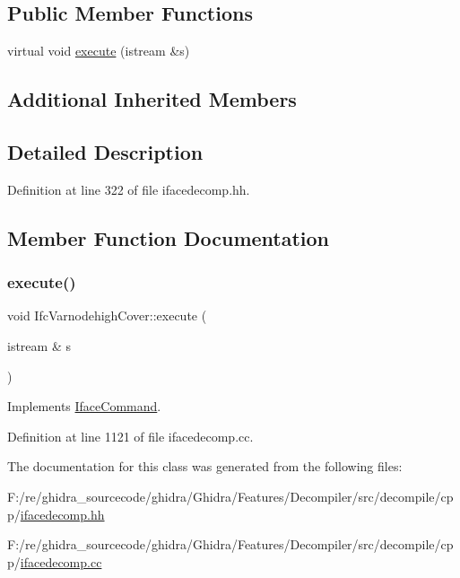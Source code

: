 \subsection*{Public Member Functions}
\begin{DoxyCompactItemize}
\item 
virtual void \mbox{\hyperlink{class_ifc_varnodehigh_cover_af8cd84bbe78884138b139ff231098894}{execute}} (istream \&s)
\end{DoxyCompactItemize}
\subsection*{Additional Inherited Members}


\subsection{Detailed Description}


Definition at line 322 of file ifacedecomp.\+hh.



\subsection{Member Function Documentation}
\mbox{\label{class_ifc_varnodehigh_cover_af8cd84bbe78884138b139ff231098894}} 
\subsubsection{\texorpdfstring{execute()}{execute()}}
{\footnotesize\ttfamily void Ifc\+Varnodehigh\+Cover\+::execute (\begin{DoxyParamCaption}\item[{istream \&}]{s }\end{DoxyParamCaption})\hspace{0.3cm}{\ttfamily [virtual]}}



Implements \mbox{\hyperlink{class_iface_command_af10e29cee2c8e419de6efe9e680ad201}{Iface\+Command}}.



Definition at line 1121 of file ifacedecomp.\+cc.



The documentation for this class was generated from the following files\+:\begin{DoxyCompactItemize}
\item 
F\+:/re/ghidra\+\_\+sourcecode/ghidra/\+Ghidra/\+Features/\+Decompiler/src/decompile/cpp/\mbox{\hyperlink{ifacedecomp_8hh}{ifacedecomp.\+hh}}\item 
F\+:/re/ghidra\+\_\+sourcecode/ghidra/\+Ghidra/\+Features/\+Decompiler/src/decompile/cpp/\mbox{\hyperlink{ifacedecomp_8cc}{ifacedecomp.\+cc}}\end{DoxyCompactItemize}
